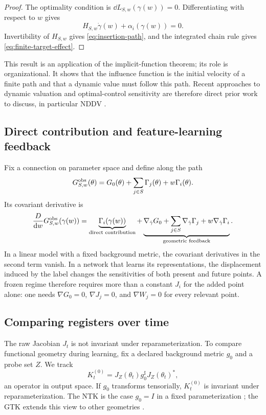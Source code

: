 \begin{proof}
The optimality condition is $\dd L_{S,w}(\gamma(w))=0$. Differentiating with respect to $w$ gives
\[
H_{S,w}\dot\gamma(w)+\alpha_i(\gamma(w))=0.
\]
Invertibility of $H_{S,w}$ gives \eqref{eq:insertion-path}, and the integrated chain rule gives \eqref{eq:finite-target-effect}.
\end{proof}

This result is an application of the implicit-function theorem; its role is organizational. It shows that the influence function is the initial velocity of a finite path and that a dynamic value must follow this path. Recent approaches to dynamic valuation and optimal-control sensitivity are therefore direct prior work to discuss, in particular NDDV \citep{liang2024nddv}.

\subsection{Direct contribution and feature-learning feedback}
Fix a connection on parameter space and define along the path
\begin{equation}
G_{S,w}^{\rm obs}(\theta)
=G_0(\theta)+\sum_{j\in S}\Gamma_j(\theta)+w\Gamma_i(\theta).
\end{equation}
Its covariant derivative is
\begin{equation}
\frac{D}{\mathrm d w}G_{S,w}^{\rm obs}(\gamma(w))
=
\underbrace{\Gamma_i(\gamma(w))}_{\text{direct contribution}}
+
\underbrace{\nabla_{\dot\gamma}G_0
+\sum_{j\in S}\nabla_{\dot\gamma}\Gamma_j
+w\nabla_{\dot\gamma}\Gamma_i}_{\text{geometric feedback}}.
\label{eq:geometric-feedback}
\end{equation}
In a linear model with a fixed background metric, the covariant derivatives in the second term vanish. In a network that learns its representations, the displacement induced by the label changes the sensitivities of both present and future points. A frozen regime therefore requires more than a constant $J_i$ for the added point alone: one needs $\nabla G_0=0$, $\nabla J_j=0$, and $\nabla W_j=0$ for every relevant point.

\subsection{Comparing registers over time}
The raw Jacobian $J_t$ is not invariant under reparameterization. To compare functional geometry during learning, fix a declared background metric $g_0$ and a probe set $Z$. We track
\begin{equation}
K_t^{(0)}=J_Z(\theta_t)g_0^\sharp J_Z(\theta_t)^*,
\label{eq:functional-kernel}
\end{equation}
an operator in output space. If $g_0$ transforms tensorially, $K_t^{(0)}$ is invariant under reparameterization. The NTK is the case $g_0=I$ in a fixed parameterization \citep{jacot2018}; the GTK extends this view to other geometries \citep{bai2025gtk}.


